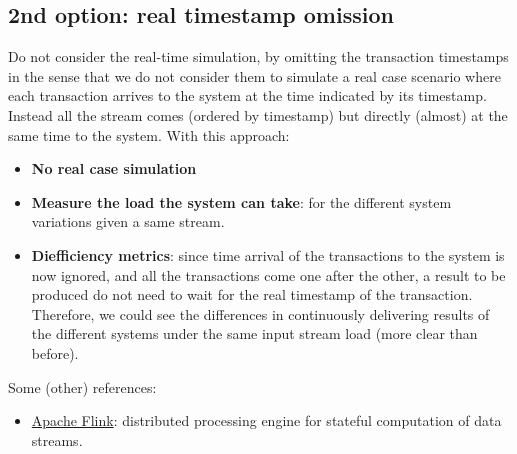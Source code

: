 \documentclass{article}
\begin{document}
\subsection{2nd option: real timestamp omission}

Do not consider the real-time simulation, by omitting the transaction timestamps in the sense that we do not consider them to simulate a real case scenario where each transaction arrives to the system at the time indicated by its timestamp. 
Instead all the stream comes (ordered by timestamp) but directly (almost) at the same time to the system. With this approach:
\begin{itemize}
  \item \textbf{No real case simulation}
  \item \textbf{Measure the load the system can take}: for the different system variations given a same stream.
  \item \textbf{Diefficiency metrics}: since time arrival of the transactions to the system is now ignored, and all the transactions come one after the other, a result to be produced do not need to wait for the real timestamp of the transaction. Therefore, we could see the differences in continuously delivering results of the different systems under the same input stream load (more clear than before).
\end{itemize}

Some (other) references:

\begin{itemize}
  \item \href{https://www.confluent.io/es-es/learn/apache-flink/}{Apache Flink}: distributed processing engine for stateful computation of data streams.
\end{itemize}

\end{document}
